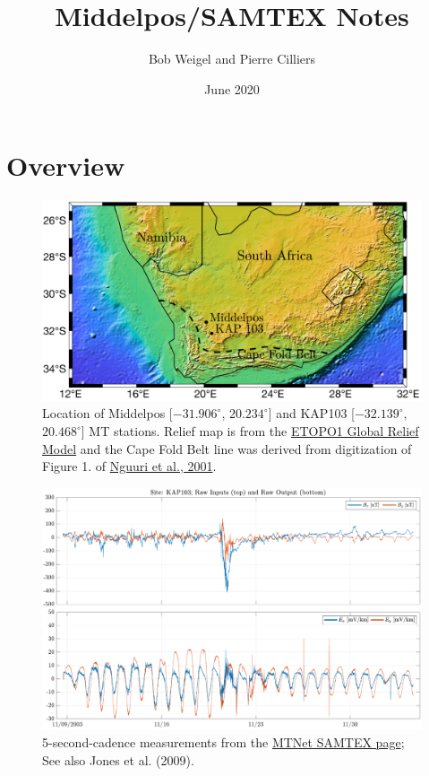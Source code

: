 \documentclass{article}
\title{Middelpos/SAMTEX Notes}
\author{Bob Weigel and Pierre Cilliers}
\date{June 2020}
\begin{document}
\section{Overview}


\begin{figure}[h!]
\centering
\includegraphics[width=\textwidth]{figures/map.pdf}
\caption{Location of Middelpos [$-31.906^\circ$, $20.234^\circ$] and KAP103 [$-32.139^\circ$, $20.468^\circ$] MT stations. Relief map is from the \href{http://ngdc.noaa.gov/mgg/global/global.html}{ETOPO1 Global Relief Model} and the Cape Fold Belt line was derived from digitization of Figure 1. of \href{https://agupubs.onlinelibrary.wiley.com/doi/pdf/10.1029/2000GL012587}{Nguuri et al., 2001}.}
\label{fig:map}
\end{figure}

\begin{figure}[h!]
\centering
\includegraphics[width=\textwidth]{figures/KAP103/timeseries.pdf}
\caption{5-second-cadence measurements from the \href{https://www.mtnet.info/data/samtex/samtex.html}{MTNet SAMTEX page}; See also Jones et al. (2009).}
\label{fig:KAP103_timeseries}
\end{figure}
\end{document}
